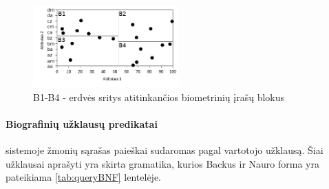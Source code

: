 \begin{figure}[H]
\begin{center}
\includegraphics[width=0.5\textwidth]{img/MultidimensionalPartitionedGallery.png}
\caption{B1-B4 - erdvės sritys atitinkančios biometrinių įrašų blokus}
\label{img:multidimensionalPartitionedGallery}
\end{center}
\end{figure}



\paragraph{Biografinių užklausų predikatai}

\cite{NeurotechnologyMegamatcherAccelerator} sistemoje žmonių sąrašas paieškai sudaromas pagal vartotojo užklausą.
Šiai užklausai aprašyti yra skirta gramatika, kurios Backus ir Nauro forma \cite{mccracken2003backus} yra pateikiama \ref{tab:queryBNF} lentelėje.

